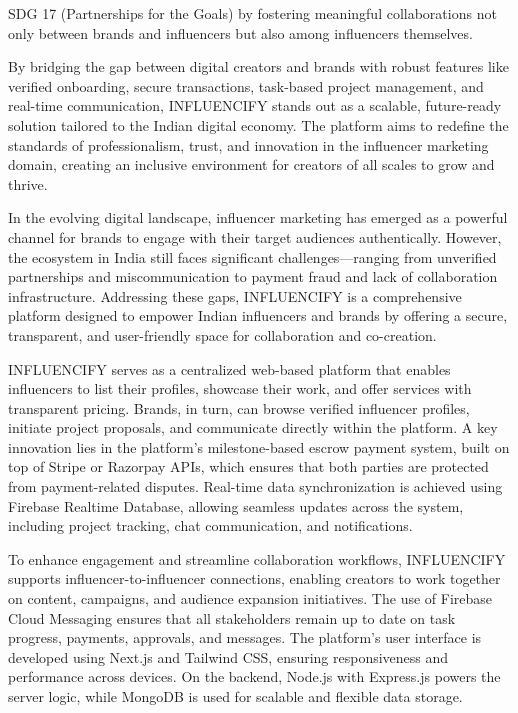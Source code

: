 \begin{justify}
SDG 17 (Partnerships for the Goals) by fostering meaningful collaborations not only between brands and influencers but also among influencers themselves.

By bridging the gap between digital creators and brands with robust features like verified onboarding, secure transactions, task-based project management, and real-time communication, INFLUENCIFY stands out as a scalable, future-ready solution tailored to the Indian digital economy. The platform aims to redefine the standards of professionalism, trust, and innovation in the influencer marketing domain, creating an inclusive environment for creators of all scales to grow and thrive.

In the evolving digital landscape, influencer marketing has emerged as a powerful channel for brands to engage with their target audiences authentically. However, the ecosystem in India still faces significant challenges—ranging from unverified partnerships and miscommunication to payment fraud and lack of collaboration infrastructure. Addressing these gaps, INFLUENCIFY is a comprehensive platform designed to empower Indian influencers and brands by offering a secure, transparent, and user-friendly space for collaboration and co-creation.

INFLUENCIFY serves as a centralized web-based platform that enables influencers to list their profiles, showcase their work, and offer services with transparent pricing. Brands, in turn, can browse verified influencer profiles, initiate project proposals, and communicate directly within the platform. A key innovation lies in the platform’s milestone-based escrow payment system, built on top of Stripe or Razorpay APIs, which ensures that both parties are protected from payment-related disputes. Real-time data synchronization is achieved using Firebase Realtime Database, allowing seamless updates across the system, including project tracking, chat communication, and notifications.

To enhance engagement and streamline collaboration workflows, INFLUENCIFY supports influencer-to-influencer connections, enabling creators to work together on content, campaigns, and audience expansion initiatives. The use of Firebase Cloud Messaging ensures that all stakeholders remain up to date on task progress, payments, approvals, and messages. The platform’s user interface is developed using Next.js and Tailwind CSS, ensuring responsiveness and performance across devices. On the backend, Node.js with Express.js powers the server logic, while MongoDB is used for scalable and flexible data storage.




\end{justify}
